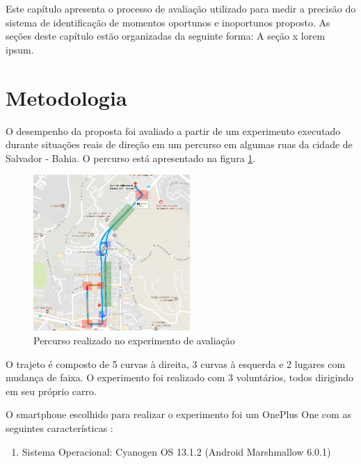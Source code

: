 \label{estudo-experimental}

Este capítulo apresenta o processo de avaliação utilizado para medir a precisão do
sistema de identificação de momentos oportunos e inoportunos proposto. As seções deste
capítulo estão organizadas da seguinte forma: A seção x lorem ipsum.

\section{Metodologia}
\label{metodologia}

O desempenho da proposta foi avaliado a partir de um experimento executado durante
situações reais de direção em um percurso em algumas ruas da cidade de Salvador -
Bahia. O percurso está apresentado na figura \ref{percurso}.

\begin{figure}[h]
\centering
\includegraphics[width=0.53\textwidth]{images/percurso.png}
\caption{Percurso realizado no experimento de avaliação}
\label{percurso}
\end{figure}

O trajeto é composto de 5 curvas à direita, 3 curvas à esquerda e 2 lugares com mudança de faixa.
O experimento foi realizado com 3 voluntários, todos dirigindo em seu próprio carro.

O smartphone escolhido para realizar o experimento foi um OnePlus One com as seguintes características
\cite{oneplusone}:

\begin{enumerate}
  \item Sistema Operacional: Cyanogen OS 13.1.2 (Android Marshmallow 6.0.1)
\end{enumerate}
